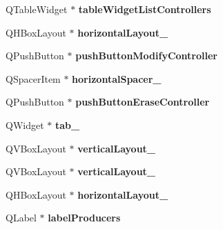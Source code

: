 \begin{DoxyCompactItemize}
\item 
\hypertarget{classUi__MainWindow_a8db585196002566bea4f60ea7f887d31}{Q\-Table\-Widget $\ast$ {\bfseries table\-Widget\-List\-Controllers}}\label{classUi__MainWindow_a8db585196002566bea4f60ea7f887d31}

\item 
\hypertarget{classUi__MainWindow_a80867018070156432923d0266cc9fe25}{Q\-H\-Box\-Layout $\ast$ {\bfseries horizontal\-Layout\-\_}}\label{classUi__MainWindow_a80867018070156432923d0266cc9fe25}

\item 
\hypertarget{classUi__MainWindow_ac86cb28e71d0851244baac28b2801ecb}{Q\-Push\-Button $\ast$ {\bfseries push\-Button\-Modify\-Controller}}\label{classUi__MainWindow_ac86cb28e71d0851244baac28b2801ecb}

\item 
\hypertarget{classUi__MainWindow_ae2007c6e48638f819d3ac57be8daa4ca}{Q\-Spacer\-Item $\ast$ {\bfseries horizontal\-Spacer\-\_}}\label{classUi__MainWindow_ae2007c6e48638f819d3ac57be8daa4ca}

\item 
\hypertarget{classUi__MainWindow_a20df6b618de31a1993c76cf49cdc763b}{Q\-Push\-Button $\ast$ {\bfseries push\-Button\-Erase\-Controller}}\label{classUi__MainWindow_a20df6b618de31a1993c76cf49cdc763b}

\item 
\hypertarget{classUi__MainWindow_a41c7e77dd12b9445e13dbe8fb5ae1488}{Q\-Widget $\ast$ {\bfseries tab\-\_}}\label{classUi__MainWindow_a41c7e77dd12b9445e13dbe8fb5ae1488}

\item 
\hypertarget{classUi__MainWindow_a7b66d5d6ab55f3977317359d09a42345}{Q\-V\-Box\-Layout $\ast$ {\bfseries vertical\-Layout\-\_}}\label{classUi__MainWindow_a7b66d5d6ab55f3977317359d09a42345}

\item 
\hypertarget{classUi__MainWindow_a93c190b085c63a667c535ba0bbcfec7c}{Q\-V\-Box\-Layout $\ast$ {\bfseries vertical\-Layout\-\_}}\label{classUi__MainWindow_a93c190b085c63a667c535ba0bbcfec7c}

\item 
\hypertarget{classUi__MainWindow_a14c9d4842c3e97e16e7873ef0aecdb1e}{Q\-H\-Box\-Layout $\ast$ {\bfseries horizontal\-Layout\-\_}}\label{classUi__MainWindow_a14c9d4842c3e97e16e7873ef0aecdb1e}

\item 
\hypertarget{classUi__MainWindow_a4d695b77f56b81fd1966ef98fe9d9f15}{Q\-Label $\ast$ {\bfseries label\-Producers}}\label{classUi__MainWindow_a4d695b77f56b81fd1966ef98fe9d9f15}


\end{DoxyCompactItemize}
